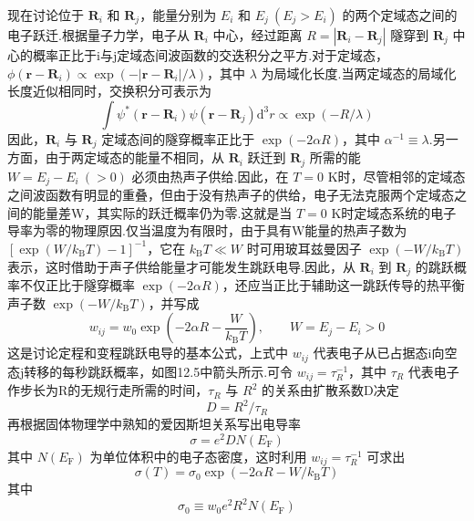 现在讨论位于 $\boldsymbol{R}_{i}$ 和 $\boldsymbol{R}_{j}$，能量分别为 $E_{i}$ 和 $E_{j}\ \left(E_{j}>E_{i}\right)$ 的两个定域态之间的电子跃迁.根据量子力学，电子从 $\boldsymbol{R}_{i}$ 中心，经过距离 $R=|\boldsymbol{R}_{i}-\boldsymbol{R}_{j}|$ 隧穿到 $\boldsymbol{R}_{j}$ 中心的概率正比于i与j定域态间波函数的交迭积分之平方.对于定域态，$\phi\left(\boldsymbol{r}-\boldsymbol{R}_{i}\right)\propto\exp\left(-|\boldsymbol{r}-\boldsymbol{R}_{i}|/\lambda\right)$，其中 $\lambda$ 为局域化长度.当两定域态的局域化长度近似相同时，交换积分可表示为
\begin{equation}
  \int\psi^{*}\left(\boldsymbol{r}-\boldsymbol{R}_{i}\right)\psi\left(\boldsymbol{r}-\boldsymbol{R}_{j}\right)\mathrm{d}^{3}r
  \propto\exp\left(-R/\lambda\right)
\end{equation}
因此，$\boldsymbol{R}_{i}$ 与 $\boldsymbol{R}_{j}$ 定域态间的隧穿概率正比于 $\exp\left(-2\alpha R\right)$，其中 $\alpha^{-1}\equiv\lambda$.另一方面，由于两定域态的能量不相同，从 $\boldsymbol{R}_{i}$ 跃迁到 $\boldsymbol{R}_{j}$ 所需的能 $W=E_{j}-E_{i}\ \left(>0\right)$ 必须由热声子供给.因此，在 $T=0$ K时，尽管相邻的定域态之间波函数有明显的重叠，但由于没有热声子的供给，电子无法克服两个定域态之间的能量差W，其实际的跃迁概率仍为零.这就是当 $T=0$ K时定域态系统的电子导率为零的物理原因.仅当温度为有限时，由于具有W能量的热声子数为 $\left[\exp\left(W/k_{\mathrm{B}}T\right)-1\right]^{-1}$，它在 $k_{\mathrm{B}}T\ll W$ 时可用玻耳兹曼因子 $\exp\left(-W/k_{\mathrm{B}}T\right)$ 表示，这时借助于声子供给能量才可能发生跳跃电导.因此，从 $\boldsymbol{R}_{i}$ 到 $\boldsymbol{R}_{j}$ 的跳跃概率不仅正比于隧穿概率 $\exp\left(-2\alpha R\right)$，还应当正比于辅助这一跳跃传导的热平衡声子数 $\exp\left(-W/k_{\mathrm{B}}T\right)$，并写成
\begin{equation}
  w_{ij}=w_{0}\exp\left(-2\alpha R-\frac{W}{k_{\mathrm{B}}T}\right),
  \qquad W=E_{j}-E_{i}>0
\end{equation}
这是讨论定程和变程跳跃电导的基本公式，上式中 $w_{ij}$ 代表电子从已占据态i向空态j转移的每秒跳跃概率，如图12.5中箭头所示.可令 $w_{ij}=\tau_{R}^{-1}$，其中 $\tau_{R}$ 代表电子作步长为R的无规行走所需的时间，$\tau_{R}$ 与 $R^{2}$ 的关系由扩散系数D决定
\begin{equation}
  D=R^{2}/\tau_{R}
\end{equation}
再根据固体物理学中熟知的爱因斯坦关系写出电导率
\begin{equation}
  \sigma=e^{2}DN\left(E_{\mathrm{F}}\right)
\end{equation}
其中 $N\left(E_{\mathrm{F}}\right)$ 为单位体积中的电子态密度，这时利用 $w_{ij}=\tau_{R}^{-1}$ 可求出
\begin{equation}
  \sigma\left(T\right)=\sigma_{0}\exp\left(-2\alpha R-W/k_{\mathrm{B}}T\right)
\end{equation}
其中
\begin{equation}
  \sigma_{0}\equiv w_{0}e^{2}R^{2}N\left(E_{\mathrm{F}}\right)
\end{equation}


